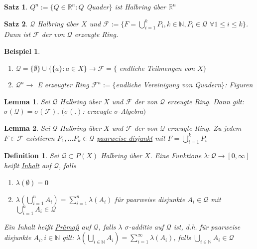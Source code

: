 \documentclass[11pt]{memoir}
\theoremstyle{changebreak}
\newtheorem{Definition}{Definition}[chapter]
\newtheorem{Beispiel}{Beispiel}[chapter]
\newtheorem{Lemma}{Lemma}[chapter]
\newtheorem{Satz}{Satz}[chapter]
\begin{document}
\begin{Satz}
$Q^n := \{Q \in \mathbb R^n: Q $ Quader$\}$ ist Halbring über $\mathbb R^n$
\end{Satz}

\begin{Satz}
$\mathscr Q$ Halbring über $X$ und $\mathscr F := \{F = \bigcup\limits_{i=1}^k P_i, k \in \mathbb N, P_i \in \mathscr Q$ $\forall 1 \leq i \leq k\}$. Dann ist $\mathscr F$ der von $\mathscr Q$ erzeugte Ring.
\end{Satz}

\begin{Beispiel}
\begin{enumerate}
	\item $\mathscr Q = \{\emptyset \} \cup \{\{a\}: a \in X\} \rightarrow \mathscr F = \{$ endliche Teilmengen von $X\}$
	\item $\mathscr Q^n \rightarrow$ E erzeugter Ring $\mathscr F^n:= \{$endliche Vereinigung von Quadern$\}$: Figuren
\end{enumerate}
\end{Beispiel}

\begin{Lemma}
Sei $\mathscr Q$ Halbring über $X$ und $\mathscr F$ der von $\mathscr Q$ erzeugte Ring. Dann gilt: $\sigma(\mathscr Q) = \sigma(\mathscr F)$, $(\sigma(.)$: erzeugte $\sigma$-Algebra$)$
\end{Lemma}

\begin{Lemma}
Sei $\mathscr Q$ Halbring über $X$ und $\mathscr F$ der von $\mathscr Q$ erzeugte Ring. Zu jedem $F \in \mathscr F$ existieren $P_1, ... P_k \in \mathscr Q$ \underline{paarweise disjunkt} mit $F = \bigcup\limits_{i=1}^k P_i$
\end{Lemma}

\begin{Definition}
Sei $\mathscr Q \subset P(X)$ Halbring über $X$. Eine Funktione $\lambda: \mathscr Q \rightarrow [0, \infty ]$ heißt \underline{Inhalt} auf $\mathscr Q$, falls
\begin{enumerate}
	\item $\lambda(\emptyset) = 0$
	\item $\lambda\left(\bigcup\limits_{i=1}^n	A_i\right) = \sum\limits_{i=1}^n \lambda(A_i)$ für paarweise disjunkte $A_i \in \mathscr Q$ mit $\bigcup\limits_{i=1}^n A_i \in \mathscr Q$
\end{enumerate}
Ein Inhalt heißt \underline{Prämaß} auf $\mathscr Q$, falls $\lambda$ $\sigma$-additiv auf $\mathscr Q$ ist, d.h. für paarweise disjunkte $A_i, i \in \mathbb N$ gilt: $\lambda\left(\bigcup\limits_{i\in \mathbb N} A_i \right) = \sum\limits_{i=1}^\infty \lambda(A_i)$, falls $\bigcup\limits_{i \in \mathbb N} A_i \in \mathscr Q$
\end{Definition}
\end{document}

